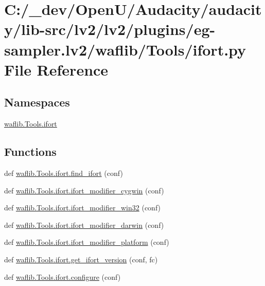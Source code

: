 \hypertarget{lv2_2plugins_2eg-sampler_8lv2_2waflib_2_tools_2ifort_8py}{}\section{C\+:/\+\_\+dev/\+Open\+U/\+Audacity/audacity/lib-\/src/lv2/lv2/plugins/eg-\/sampler.lv2/waflib/\+Tools/ifort.py File Reference}
\label{lv2_2plugins_2eg-sampler_8lv2_2waflib_2_tools_2ifort_8py}
\subsection*{Namespaces}
\begin{DoxyCompactItemize}
\item 
 \hyperlink{namespacewaflib_1_1_tools_1_1ifort}{waflib.\+Tools.\+ifort}
\end{DoxyCompactItemize}
\subsection*{Functions}
\begin{DoxyCompactItemize}
\item 
def \hyperlink{namespacewaflib_1_1_tools_1_1ifort_aa6838492a72ffb343c49d099cbbe1a25}{waflib.\+Tools.\+ifort.\+find\+\_\+ifort} (conf)
\item 
def \hyperlink{namespacewaflib_1_1_tools_1_1ifort_aa44d118aa83e088e0ab4e7ab47d662de}{waflib.\+Tools.\+ifort.\+ifort\+\_\+modifier\+\_\+cygwin} (conf)
\item 
def \hyperlink{namespacewaflib_1_1_tools_1_1ifort_a89fe1b18d4886bfeec97636459f81d35}{waflib.\+Tools.\+ifort.\+ifort\+\_\+modifier\+\_\+win32} (conf)
\item 
def \hyperlink{namespacewaflib_1_1_tools_1_1ifort_a3078d523f12c208147b3ee500f2cbd99}{waflib.\+Tools.\+ifort.\+ifort\+\_\+modifier\+\_\+darwin} (conf)
\item 
def \hyperlink{namespacewaflib_1_1_tools_1_1ifort_a468f9dd549fcae601c2733fae8e70e25}{waflib.\+Tools.\+ifort.\+ifort\+\_\+modifier\+\_\+platform} (conf)
\item 
def \hyperlink{namespacewaflib_1_1_tools_1_1ifort_afde0bb56d9602a855a6357c8021ace77}{waflib.\+Tools.\+ifort.\+get\+\_\+ifort\+\_\+version} (conf, fc)
\item 
def \hyperlink{namespacewaflib_1_1_tools_1_1ifort_a2eceee8c0f041a660b0759d18822b668}{waflib.\+Tools.\+ifort.\+configure} (conf)
\end{DoxyCompactItemize}
